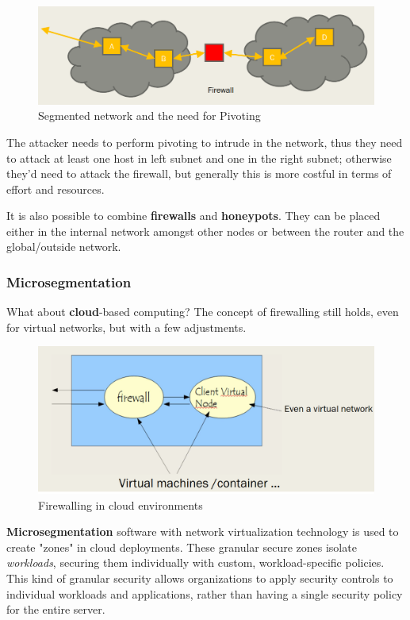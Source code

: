 \begin{figure}[htbp]
   \centering
   \includegraphics{images/pivoting.png}
   \caption{Segmented network and the need for Pivoting}
   \label{fig:pivoting}
\end{figure}

The attacker needs to perform pivoting to intrude in the network, thus they need to attack at least one host in left subnet and one in the right subnet;
otherwise they'd need to attack the firewall, but generally this is more costful in terms of effort and resources.

It is also possible to combine \textbf{firewalls} and \textbf{honeypots}.
They can be placed either in the internal network amongst other nodes or between the router and the global/outside network.

\subsubsection{Microsegmentation}

What about \textbf{cloud}-based computing?
The concept of firewalling still holds,
even for virtual networks,
but with a few adjustments.
\begin{figure}[htbp]
   \centering
   \includegraphics{images/firewall_cloud.png}
   \caption{Firewalling in cloud environments}
   \label{fig:firewall_cloud}
\end{figure}

\textbf{Microsegmentation} software with network virtualization technology is
used to create "zones" in cloud deployments.
These granular secure zones isolate \textit{workloads}, securing them individually with custom,
workload-specific policies.
This kind of granular security allows organizations to apply security controls to individual workloads and
applications, rather than having a single security policy for the entire server.

